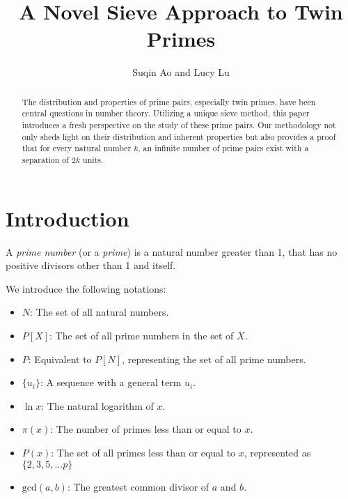 \documentclass{aomart}
\title[A Novel Sieve Approach to Twin Primes]{A Novel Sieve Approach to Twin Primes}
\author[S. Ao and L. Lu]{Suqin Ao and Lucy Lu}
\begin{document}
\begin{abstract}
  The distribution and properties of prime pairs, especially twin primes, have been central questions in number theory. Utilizing a unique sieve method, this paper introduces a fresh perspective on the study of these prime pairs. Our methodology not only sheds light on their distribution and inherent properties but also provides a proof that for every natural number \( k \), an infinite number of prime pairs exist with a separation of \( 2k \) units.  

\end{abstract}

\maketitle
\tableofcontents

\section{Introduction}

A \textit{prime number} (or a \textit{prime}) is a natural number greater than 1, that has no positive divisors other than 1 and itself.  
\vspace{1\baselineskip}

We introduce the following notations:

\begin{itemize}
    \item \( N \): The set of all natural numbers.
    \item \( P[X] \): The set of all prime numbers in the set of \( X \).
    \item \( P \): Equivalent to \( P[N] \), representing the set of all prime numbers.
    \item \( \{ u_{i} \} \): A sequence with a general term \( u_{i} \).
    \item \( \ln x \): The natural logarithm of \( x \).
    \item \( \pi (x) \): The number of primes less than or equal to \( x \).
    \item \( P(x) \): The set of all primes less than or equal to \( x \), represented as \( \{ 2,3,5,\ldots p \} \)
    \item \( \text{gcd}(a,b) \): The greatest common divisor of \( a \) and \( b \).

\end{itemize}

\vspace{1\baselineskip}
\end{document}
